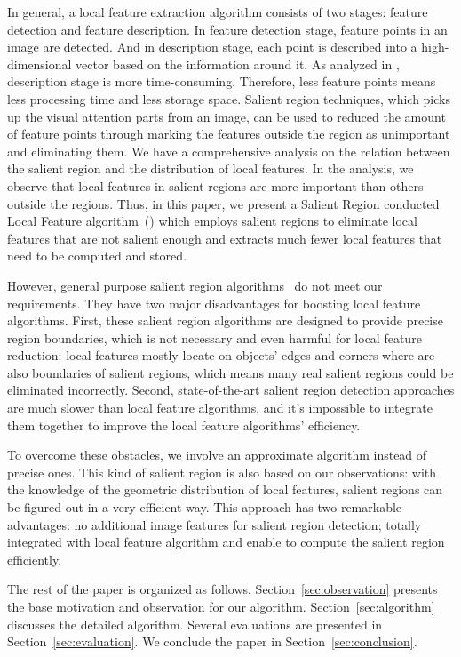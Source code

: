 In general, a local feature extraction algorithm consists of two stages: feature detection and feature description. In feature detection stage, feature points in an image are detected. And in description stage, each point is described into a high-dimensional vector based on the information around it. As analyzed in \cite{adaptivepipelineicpp2012}, description stage is more time-consuming. Therefore, less feature points means less processing time and less storage space. Salient region techniques, which picks up the visual attention parts from an image, can be used to reduced the amount of feature points through marking the features outside the region as unimportant and eliminating them. We have a comprehensive analysis on the relation between the salient region and the distribution of local features. In the analysis, we observe that local features in salient regions are more important than others outside the regions. Thus, in this paper, we present a Salient Region conducted Local Feature algorithm~({\sys}) which employs salient regions to eliminate local features that are not salient enough and extracts much fewer local features that need to be computed and stored.

However, general purpose salient region algorithms~\cite{cheng2011global,achanta2009frequency,itti1998model} do not meet our requirements. They have two major disadvantages for boosting local feature algorithms. First, these salient region algorithms are designed to provide precise region boundaries, which is not necessary and even harmful for local feature reduction: local features mostly locate on objects' edges and corners where are also boundaries of salient regions, which means many real salient regions could be eliminated incorrectly. Second, state-of-the-art salient region detection approaches are much slower than local feature algorithms, and it's impossible to integrate them together to improve the local feature algorithms' efficiency.

To overcome these obstacles, we involve an approximate algorithm instead of precise ones. This kind of salient region is also based on our observations: with the knowledge of the geometric distribution of local features, salient regions can be figured out in a very efficient way. This approach has two remarkable advantages: no additional image features for salient region detection; totally integrated with local feature algorithm and enable to compute the salient region efficiently.

The rest of the paper is organized as follows. Section~\ref{sec:observation} presents the base motivation and observation for our algorithm. Section~\ref{sec:algorithm} discusses the detailed algorithm. Several evaluations are presented in Section~\ref{sec:evaluation}. We conclude the paper in Section~\ref{sec:conclusion}.
